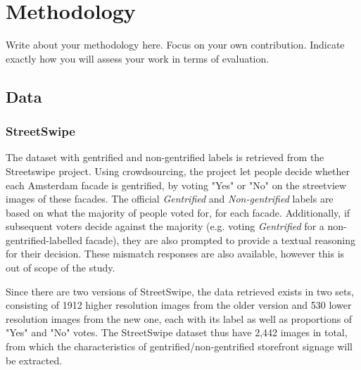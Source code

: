 \section{Methodology}
\label{sec:methodology}
Write about your methodology here. Focus on your own contribution. Indicate exactly how you will assess your work in terms of evaluation.


\subsection{Data}
\subsubsection{StreetSwipe}
The dataset with gentrified and non-gentrified labels is retrieved from the Streetswipe project. Using crowdsourcing, the project let people decide whether each Amsterdam facade is gentrified, by voting "Yes" or "No" on the streetview images of these facades. The official \textit{Gentrified} and \textit{Non-gentrified} labels are based on what the majority of people voted for, for each facade. Additionally, if subsequent voters decide against the majority (e.g. voting \textit{Gentrified} for a non-gentrified-labelled facade), they are also prompted to provide a textual reasoning for their decision. These mismatch responses are also available, however this is out of scope of the study. 

Since there are two versions of StreetSwipe, the data retrieved exists in two sets, consisting of 1912 higher resolution images from the older version and 530 lower resolution images from the new one, each with its label as well as proportions of "Yes" and "No" votes. The StreetSwipe dataset thus have 2,442 images in total, from which the characteristics of gentrified/non-gentrified storefront signage will be extracted.

